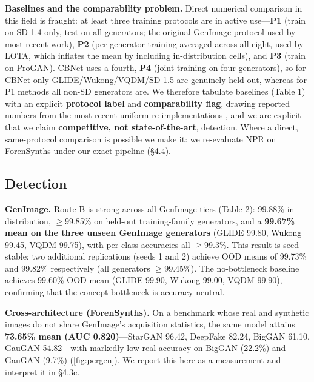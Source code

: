 \textbf{Baselines and the comparability problem.} Direct numerical comparison in this field is fraught: at least three training protocols are in active use---\textbf{P1} (train on SD-1.4 only, test on all generators; the original GenImage protocol used by most recent work), \textbf{P2} (per-generator training averaged across all eight, used by LOTA, which inflates the mean by including in-distribution cells), and \textbf{P3} (train on ProGAN). CBNet uses a fourth, \textbf{P4} (joint training on four generators), so for CBNet only GLIDE/Wukong/VQDM/SD-1.5 are genuinely held-out, whereas for P1 methods all non-SD generators are. We therefore tabulate baselines (Table 1) with an explicit \textbf{protocol label} and \textbf{comparability flag}, drawing reported numbers from the most recent uniform re-implementations \citep{zhu2023genimage, tan2024npr, wang2025lota, ojha2023universal}, and we are explicit that we claim \textbf{competitive, not state-of-the-art}, detection. Where a direct, same-protocol comparison is possible we make it: we re-evaluate NPR \citep{tan2024npr} on ForenSynths under our exact pipeline (\S{}4.4).



\subsection{Detection}

\textbf{GenImage.} Route B is strong across all GenImage tiers (Table 2): 99.88\% in-distribution, \ensuremath{\geq}99.85\% on held-out training-family generators, and a \textbf{99.67\% mean on the three unseen GenImage generators} (GLIDE 99.80, Wukong 99.45, VQDM 99.75), with per-class accuracies all \ensuremath{\geq}99.3\%. This result is seed-stable: two additional replications (seeds 1 and 2) achieve OOD means of 99.73\% and 99.82\% respectively (all generators \ensuremath{\geq}99.45\%). The no-bottleneck baseline achieves 99.60\% OOD mean (GLIDE 99.90, Wukong 99.00, VQDM 99.90), confirming that the concept bottleneck is accuracy-neutral.



\textbf{Cross-architecture (ForenSynths).} On a benchmark whose real and synthetic images do not share GenImage's acquisition statistics, the same model attains \textbf{73.65\% mean (AUC 0.820)}---StarGAN 96.42, DeepFake 82.24, BigGAN 61.10, GauGAN 54.82---with markedly low real-accuracy on BigGAN (22.2\%) and GauGAN (9.7\%) (\autoref{fig:pergen}). We report this here as a measurement and interpret it in \S{}4.3c.

